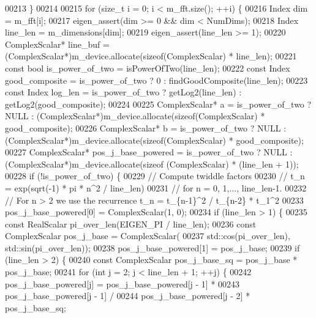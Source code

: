 \begin{DoxyCode}
00213     \}
00214 
00215     \textcolor{keywordflow}{for} (\textcolor{keywordtype}{size\_t} i = 0; i < m\_fft.size(); ++i) \{
00216       Index dim = m\_fft[i];
00217       eigen\_assert(dim >= 0 && dim < NumDims);
00218       Index line\_len = m\_dimensions[dim];
00219       eigen\_assert(line\_len >= 1);
00220       ComplexScalar* line\_buf = (ComplexScalar*)m\_device.allocate(\textcolor{keyword}{sizeof}(ComplexScalar) * line\_len);
00221       \textcolor{keyword}{const} \textcolor{keywordtype}{bool} is\_power\_of\_two = isPowerOfTwo(line\_len);
00222       \textcolor{keyword}{const} Index good\_composite = is\_power\_of\_two ? 0 : findGoodComposite(line\_len);
00223       \textcolor{keyword}{const} Index log\_len = is\_power\_of\_two ? getLog2(line\_len) : getLog2(good\_composite);
00224 
00225       ComplexScalar* a = is\_power\_of\_two ? NULL : (ComplexScalar*)m\_device.allocate(\textcolor{keyword}{sizeof}(ComplexScalar) *
       good\_composite);
00226       ComplexScalar* b = is\_power\_of\_two ? NULL : (ComplexScalar*)m\_device.allocate(\textcolor{keyword}{sizeof}(ComplexScalar) *
       good\_composite);
00227       ComplexScalar* pos\_j\_base\_powered = is\_power\_of\_two ? NULL : (ComplexScalar*)m\_device.allocate(\textcolor{keyword}{sizeof}
      (ComplexScalar) * (line\_len + 1));
00228       \textcolor{keywordflow}{if} (!is\_power\_of\_two) \{
00229         \textcolor{comment}{// Compute twiddle factors}
00230         \textcolor{comment}{//   t\_n = exp(sqrt(-1) * pi * n^2 / line\_len)}
00231         \textcolor{comment}{// for n = 0, 1,..., line\_len-1.}
00232         \textcolor{comment}{// For n > 2 we use the recurrence t\_n = t\_\{n-1\}^2 / t\_\{n-2\} * t\_1^2}
00233         pos\_j\_base\_powered[0] = ComplexScalar(1, 0);
00234         \textcolor{keywordflow}{if} (line\_len > 1) \{
00235           \textcolor{keyword}{const} RealScalar pi\_over\_len(EIGEN\_PI / line\_len);
00236           \textcolor{keyword}{const} ComplexScalar pos\_j\_base = ComplexScalar(
00237            std::cos(pi\_over\_len), std::sin(pi\_over\_len));
00238           pos\_j\_base\_powered[1] = pos\_j\_base;
00239           \textcolor{keywordflow}{if} (line\_len > 2) \{
00240             \textcolor{keyword}{const} ComplexScalar pos\_j\_base\_sq = pos\_j\_base * pos\_j\_base;
00241             \textcolor{keywordflow}{for} (\textcolor{keywordtype}{int} j = 2; j < line\_len + 1; ++j) \{
00242               pos\_j\_base\_powered[j] = pos\_j\_base\_powered[j - 1] *
00243                                       pos\_j\_base\_powered[j - 1] /
00244                                       pos\_j\_base\_powered[j - 2] * pos\_j\_base\_sq;

\end{DoxyCode}
